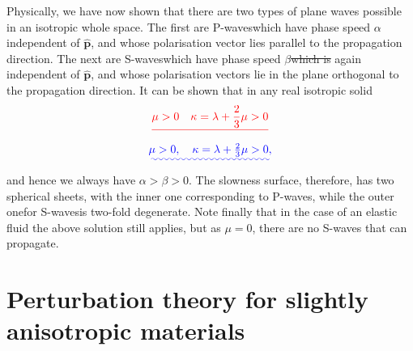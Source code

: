 \documentclass [a4paper,12pt]{paper}
\providecommand{\DIFadd}[1]{{\protect\color{blue}\uwave{#1}}} %
\providecommand{\DIFdel}[1]{{\protect\color{red}\sout{#1}}}                      %
\providecommand{\DIFaddbegin}{} %
\providecommand{\DIFaddend}{} %
\providecommand{\DIFdelbegin}{} %
\providecommand{\DIFdelend}{} %
\begin{document}
Physically, we have now shown that there are two types of plane waves possible in an isotropic whole space. The first 
are P-waves\DIFaddbegin \DIFadd{, }\DIFaddend which have phase speed $\alpha$
independent of $\hat{\mathbf{p}}$, and whose polarisation vector lies parallel
to the propagation direction. The next are S-waves\DIFaddbegin \DIFadd{, }\DIFaddend which have phase speed $\beta$\DIFdelbegin \DIFdel{which is }\DIFdelend \DIFaddbegin \DIFadd{, }\DIFaddend again independent of $\hat{\mathbf{p}}$, and 
whose polarisation vectors lie in the plane orthogonal to the propagation direction. It can be shown
 that in any real isotropic solid
\DIFdelbegin \begin{displaymath}
\DIFdel{\mu>0 \quad \kappa=\lambda+\frac{2}{3}\mu>0
}\end{displaymath}%
\DIFdelend \DIFaddbegin \begin{equation}
\DIFadd{\mu>0,\quad \kappa=\lambda+\tfrac{2}{3}\mu>0,
\label{eq:28}
}\end{equation}\DIFaddend 
and hence we always have $\alpha>\beta>0$. The slowness surface, therefore, has two spherical sheets, with the inner one corresponding to 
P-waves, while the outer one\DIFaddbegin \DIFadd{, }\DIFaddend for S-waves\DIFaddbegin \DIFadd{, }\DIFaddend is two-fold degenerate. Note finally that in the case of
an elastic fluid the above solution still applies, but as $\mu=0$, there are no S-waves that can propagate.

\section*{Perturbation theory for slightly anisotropic materials}
\end{document}
